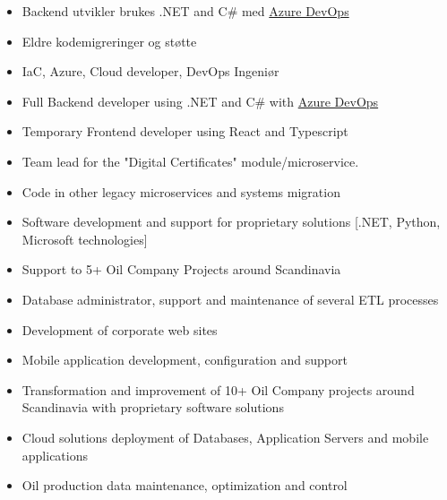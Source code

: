 
\begin{itemize}
    \item Backend utvikler brukes .NET and C\# med \href{dev.azure.com}{Azure DevOps} 
    \item Eldre kodemigreringer og støtte
    \item IaC, Azure, Cloud developer, DevOps Ingeniør
\end{itemize}

\divider


\begin{itemize}
    \item Full Backend developer using .NET and C\# with \href{dev.azure.com}{Azure DevOps} 
    \item Temporary Frontend developer using React and Typescript
    \item Team lead for the "Digital Certificates"  module/microservice.
    \item Code in other legacy microservices and systems migration
\end{itemize}

\divider

\begin{itemize}
\item Software development and support for proprietary solutions [.NET, Python, Microsoft technologies]
\item Support to 5+ Oil Company Projects around Scandinavia
\item Database administrator, support and maintenance of several ETL processes
\item Development of corporate web sites
\item Mobile application development, configuration and support
\end{itemize}

\divider

\begin{itemize}
\item Transformation and improvement of 10+ Oil Company projects around Scandinavia with proprietary software solutions
\item Cloud solutions deployment of Databases, Application Servers and mobile applications
\item Oil production data maintenance, optimization and control
\end{itemize}

